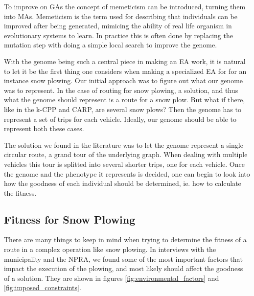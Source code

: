 To improve on GAs the concept of memeticism can be introduced, turning them into MAs. Memeticism is the term used for describing that individuals can be improved after being generated, mimicing the ability of real life organism in evolutionary systems to learn. In practice this is often done by replacing the mutation step with doing a simple local search to improve the genome.

With the genome being such a central piece in making an EA work, it is natural to let it be the first thing one considers when making a specialized EA for for an instance snow plowing. Our initial approach was to figure out what our genome was to represent. In the case of routing for snow plowing, a solution, and thus what the genome should represent is a route for a snow plow. But what if there, like in the k-CPP and CARP, are several snow plows? Then the genome has to represent a set of trips for each vehicle. Ideally, our genome should be able to represent both these cases.

The solution we found in the literature was to let the genome represent a single circular route, a grand tour of the underlying graph. When dealing with multiple vehicles this tour is splitted into several shorter trips, one for each vehicle. Once the genome and the phenotype it represents is decided, one can begin to look into how the goodness of each individual should be determined, ie. how to calculate the fitness.



\subsection{Fitness for Snow Plowing} %
\label{sub:fitness_for_snow_plowing}

There are many things to keep in mind when trying to determine the fitness of a route in a complex operation like snow plowing. In interviews with the municipality and the NPRA, we found some of the most important factors that impact the execution of the plowing, and most likely should affect the goodness of a solution. They are shown in figures \ref{fig:environmental_factors} and \ref{fig:imposed_constraints}.


